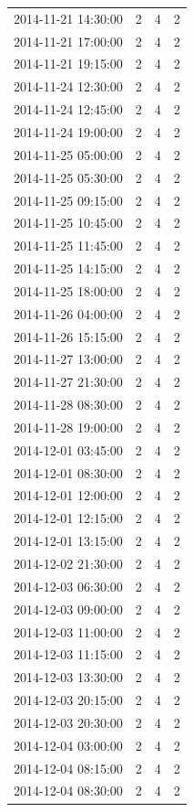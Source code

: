 \begin{tabular}{lrrr}
2014-11-21 14:30:00 & 2 & 4 & 2 \\
2014-11-21 17:00:00 & 2 & 4 & 2 \\
2014-11-21 19:15:00 & 2 & 4 & 2 \\
2014-11-24 12:30:00 & 2 & 4 & 2 \\
2014-11-24 12:45:00 & 2 & 4 & 2 \\
2014-11-24 19:00:00 & 2 & 4 & 2 \\
2014-11-25 05:00:00 & 2 & 4 & 2 \\
2014-11-25 05:30:00 & 2 & 4 & 2 \\
2014-11-25 09:15:00 & 2 & 4 & 2 \\
2014-11-25 10:45:00 & 2 & 4 & 2 \\
2014-11-25 11:45:00 & 2 & 4 & 2 \\
2014-11-25 14:15:00 & 2 & 4 & 2 \\
2014-11-25 18:00:00 & 2 & 4 & 2 \\
2014-11-26 04:00:00 & 2 & 4 & 2 \\
2014-11-26 15:15:00 & 2 & 4 & 2 \\
2014-11-27 13:00:00 & 2 & 4 & 2 \\
2014-11-27 21:30:00 & 2 & 4 & 2 \\
2014-11-28 08:30:00 & 2 & 4 & 2 \\
2014-11-28 19:00:00 & 2 & 4 & 2 \\
2014-12-01 03:45:00 & 2 & 4 & 2 \\
2014-12-01 08:30:00 & 2 & 4 & 2 \\
2014-12-01 12:00:00 & 2 & 4 & 2 \\
2014-12-01 12:15:00 & 2 & 4 & 2 \\
2014-12-01 13:15:00 & 2 & 4 & 2 \\
2014-12-02 21:30:00 & 2 & 4 & 2 \\
2014-12-03 06:30:00 & 2 & 4 & 2 \\
2014-12-03 09:00:00 & 2 & 4 & 2 \\
2014-12-03 11:00:00 & 2 & 4 & 2 \\
2014-12-03 11:15:00 & 2 & 4 & 2 \\
2014-12-03 13:30:00 & 2 & 4 & 2 \\
2014-12-03 20:15:00 & 2 & 4 & 2 \\
2014-12-03 20:30:00 & 2 & 4 & 2 \\
2014-12-04 03:00:00 & 2 & 4 & 2 \\
2014-12-04 08:15:00 & 2 & 4 & 2 \\
2014-12-04 08:30:00 & 2 & 4 & 2 \\

\end{tabular}
